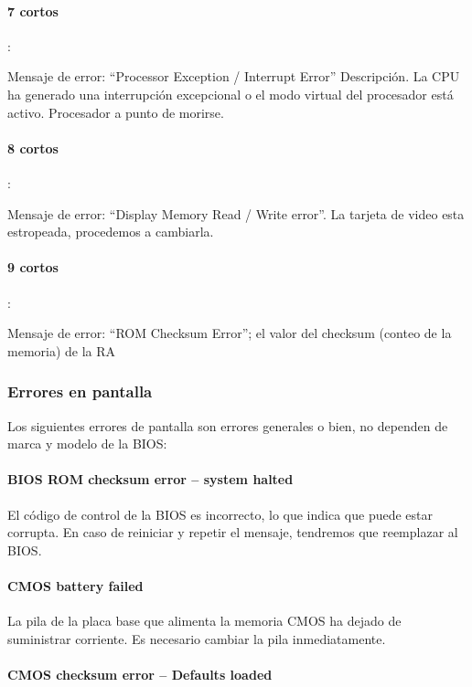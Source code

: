 \documentclass[12pt,oneside,a4paper]{article}
\begin{document}
			\paragraph{7 cortos}:
			
			Mensaje de error: “Processor Exception / Interrupt Error” Descripción. La CPU ha generado una interrupción excepcional o el modo virtual del procesador está activo. Procesador a punto de morirse. 

			\paragraph{8 cortos}:
			
			Mensaje de error: ``Display Memory Read / Write error''. La tarjeta de video esta estropeada, procedemos a cambiarla. 

			\paragraph{9 cortos}:
			
			Mensaje de error: ``ROM Checksum Error''; el valor del checksum (conteo de la memoria) de la RA

		\newpage

		\subsubsection{Errores en pantalla}\label{sub:errores en pantalla}
		
		Los siguientes errores de pantalla son errores generales o bien, no dependen de marca y modelo de la BIOS:

			\paragraph{BIOS ROM checksum error – system halted}

			El código de control de la BIOS es incorrecto, lo que indica que puede
			estar corrupta. En caso de reiniciar y repetir el mensaje, tendremos
			que reemplazar al BIOS.

			\paragraph{CMOS battery failed}

			La pila de la placa base que alimenta la memoria CMOS ha dejado de
			suministrar corriente. Es necesario cambiar la pila inmediatamente.

			\paragraph{CMOS checksum error – Defaults loaded}
\end{document}
